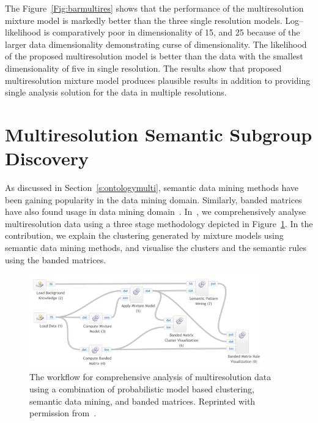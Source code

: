 The Figure~\ref{Fig:barmultires} shows that the performance
of the multiresolution mixture model  is markedly better than the 
three single resolution models. Log--likelihood is comparatively 
poor in dimensionality of 15, and 25 because 
of the larger data dimensionality demonstrating curse of
dimensionality. The likelihood of the 
proposed multiresolution model is better than the data with 
the smallest dimensionality of five in single resolution. The 
results show that proposed multiresolution mixture model 
produces plausible results in addition to providing single 
analysis solution for the data in multiple resolutions.


\section[Semantic Multiresolution Modelling]
{Multiresolution Semantic Subgroup Discovery}
\label{s:Semantic}

As discussed in Section~\ref{s:ontologymulti}, semantic data 
mining methods have been gaining popularity in the data mining
domain. Similarly, banded matrices have also found usage in 
data mining domain~\cite{elden2007,garriga2011banded}. In~, 
we comprehensively analyse multiresolution data using a three 
stage methodology depicted in Figure~\ref{Fig:sematicworkflow}. 
In the contribution, we explain the clustering generated by 
mixture models using semantic data mining methods, and visualise 
the clusters and the semantic rules using the banded matrices. 


\begin{figure}[h!]
\centering
\includegraphics[trim=15mm 7mm 15mm 2mm,width=0.9\textwidth]{figures/sematicworkflow}
\caption[Workflow of Semantic Data Mining of Cluster.]
{The workflow for comprehensive analysis of multiresolution
data using a combination of probabilistic model based clustering, 
semantic data mining, and banded matrices. Reprinted with permission 
from~.} 
\label{Fig:sematicworkflow}
\end{figure}

